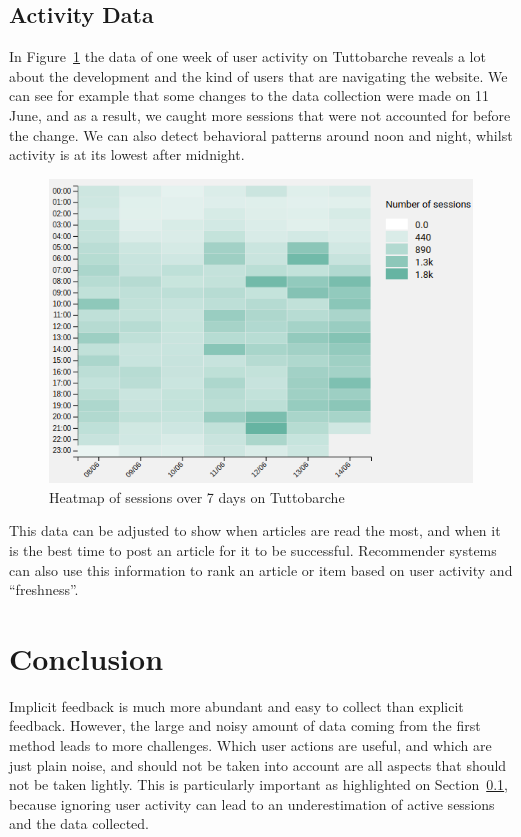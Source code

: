 \documentclass[sigconf,nonacm]{acmart}
\begin{document}
\subsection{Activity Data}
\label{sec:activity-data}

In Figure~\ref{fig:session-heatmap} the data of one week of user activity on
Tuttobarche reveals a lot about the development and the kind of users that are
navigating the website. We can see for example that some changes to the data
collection were made on 11 June, and as a result, we caught more sessions that
were not accounted for before the change. We can also detect behavioral patterns
around noon and night, whilst activity is at its lowest after midnight.

\begin{figure}[h]
  \centering
  \includegraphics[width=0.8 \linewidth]{session-heatmap.png}
  \caption{Heatmap of sessions over 7 days on Tuttobarche}
  \label{fig:session-heatmap}
\end{figure}

This data can be adjusted to show when articles are read the most, and when it
is the best time to post an article for it to be successful. Recommender systems
can also use this information to rank an article or item based on user activity
and ``freshness''.

\section{Conclusion}

Implicit feedback is much more abundant and easy to collect than explicit feedback.
However, the large and noisy amount of data coming from the first method leads to
more challenges. Which user actions are useful, and which are just plain noise,
and should not be taken into account are all aspects that should not be taken
lightly. This is particularly important as highlighted on
Section~\ref{sec:activity-data}, because ignoring user activity can lead to an
underestimation of active sessions and the data collected.
\end{document}
